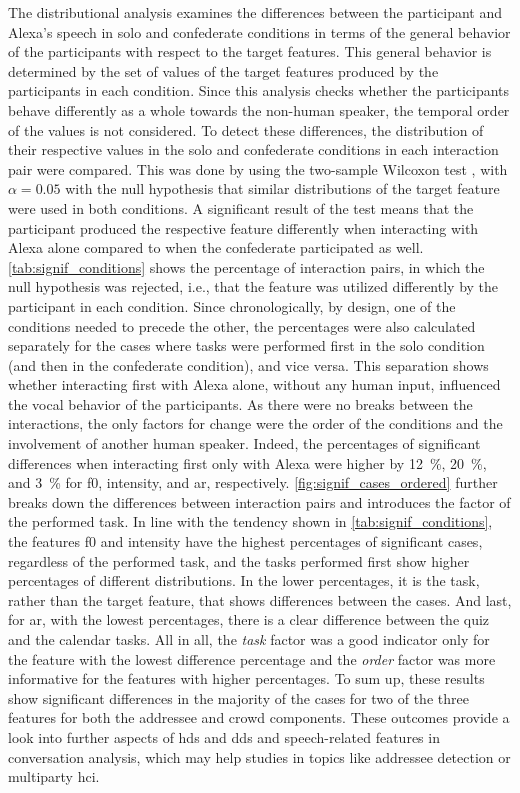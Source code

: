 The distributional analysis examines the differences between the participant and Alexa's speech in solo and confederate conditions in terms of the general behavior of the participants with respect to the target features.
This general behavior is determined by the set of values of the target features produced by the participants in each condition.
Since this analysis checks whether the participants behave differently as a whole towards the non-human speaker, the temporal order of the values is not considered.
To detect these differences, the distribution of their respective values in the solo and confederate conditions in each interaction pair were compared.
This was done by using the two-sample Wilcoxon test \citep{Wilcoxon1945individual}, with $\alpha = 0.05$ with the null hypothesis that similar distributions of the target feature were used in both conditions.
A significant result of the test means that the participant produced the respective feature differently when interacting with Alexa alone compared to when the confederate participated as well.
\cref{tab:signif_conditions} shows the percentage of interaction pairs, in which the null hypothesis was rejected, i.e., that the feature was utilized differently by the participant in each condition.
Since chronologically, by design, one of the conditions needed to precede the other, the percentages were also calculated separately for the cases where tasks were performed first in the solo condition (and then in the confederate condition), and vice versa.
This separation shows whether interacting first with Alexa alone, without any human input, influenced the vocal behavior of the participants.
As there were no breaks between the interactions, the only factors for change were the order of the conditions and the involvement of another human speaker.
Indeed, the percentages of significant differences when interacting first only with Alexa were higher by \SI{12}{\percent}, \SI{20}{\percent}, and \SI{3}{\percent} for \ac{f0}, intensity, and \ac{ar}, respectively.
\cref{fig:signif_cases_ordered} further breaks down the differences between interaction pairs and introduces the factor of the performed task.
In line with the tendency shown in \cref{tab:signif_conditions}, the features \ac{f0} and intensity have the highest percentages of significant cases, regardless of the performed task, and the tasks performed first show higher percentages of different distributions.
In the lower percentages, it is the task, rather than the target feature, that shows differences between the cases.
And last, for \ac{ar}, with the lowest percentages, there is a clear difference between the quiz and the calendar tasks.
All in all, the \emph{task} factor was a good indicator only for the feature with the lowest difference percentage and the \emph{order} factor was more informative for the features with higher percentages.
To sum up, these results show significant differences in the majority of the cases for two of the three features for both the addressee and crowd components.
These outcomes provide a look into further aspects of \ac{hds} and \ac{dds} and speech-related features in conversation analysis, which may help studies in topics like addressee detection or  multiparty \ac{hci}.

